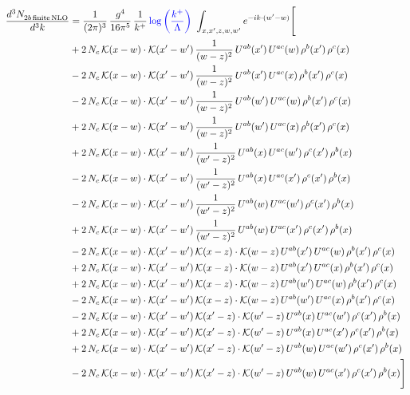 \documentclass[9pt]{article}
\numberwithin{equation}{section}
\begin{document}
\begin{align}
\frac{d^{3}N_{2b\,\rm finite\, NLO}^{\rm}}{d^{3}k} & = \frac{1}{(2\pi)^{3}}\,\frac{g^{4}}{16\pi^{5}}\,\frac{1}{k^{+}}\,{\color{blue}\log{\left(\frac{k^{+}}{\Lambda}\right)}}\,\,\int_{x,x',z,w,w'}e^{-ik\cdot(w'-w)}\Bigg[\notag\\ & +2\,N_{c}\,\mathcal{K}(x-w)\cdot\mathcal{K}(x'-w')\,\frac{1}{(w-z)^{2}}\,U^{ab}(x')\,U^{ac}(w)\,\rho^{b}(x')\,\rho^{c}(x)\notag\\
&-2\,N_{c}\,\mathcal{K}(x-w)\cdot\mathcal{K}(x'-w')\,\frac{1}{(w-z)^{2}}\,U^{ab}(x')\,U^{ac}(x)\,\rho^{b}(x')\,\rho^{c}(x)\notag\\
&-2\,N_{c}\,\mathcal{K}(x-w)\cdot\mathcal{K}(x'-w')\,\frac{1}{(w-z)^{2}}\,U^{ab}(w')\,U^{ac}(w)\,\rho^{b}(x')\,\rho^{c}(x)\notag\\
&+2\,N_{c}\,\mathcal{K}(x-w)\cdot\mathcal{K}(x'-w')\,\frac{1}{(w-z)^{2}}\,U^{ab}(w')\,U^{ac}(x)\,\rho^{b}(x')\,\rho^{c}(x)\notag\\
&+2\,N_{c}\,\mathcal{K}(x-w)\cdot\mathcal{K}(x'-w')\,\frac{1}{(w'-z)^{2}}\,U^{ab}(x)\,U^{ac}(w')\,\rho^{c}(x')\,\rho^{b}(x)\notag\\
&-2\,N_{c}\,\mathcal{K}(x-w)\cdot\mathcal{K}(x'-w')\,\frac{1}{(w'-z)^{2}}\,U^{ab}(x)\,U^{ac}(x')\,\rho^{c}(x')\,\rho^{b}(x)\notag\\
&-2\,N_{c}\,\mathcal{K}(x-w)\cdot\mathcal{K}(x'-w')\,\frac{1}{(w'-z)^{2}}\,U^{ab}(w)\,U^{ac}(w')\,\rho^{c}(x')\,\rho^{b}(x)\notag\\
&+2\,N_{c}\,\mathcal{K}(x-w)\cdot\mathcal{K}(x'-w')\,\frac{1}{(w'-z)^{2}}\,U^{ab}(w)\,U^{ac}(x')\,\rho^{c}(x')\,\rho^{b}(x)\notag\\
&-2\,N_{c}\,\mathcal{K}(x-w)\cdot\mathcal{K}(x'-w')\,\mathcal{K}(x-z)\cdot\mathcal{K}(w-z)\,U^{ab}(x')\,U^{ac}(w)\,\rho^{b}(x')\,\rho^{c}(x)\notag\\
&+2\,N_{c}\,\mathcal{K}(x-w)\cdot\mathcal{K}(x'-w')\,\mathcal{K}(x-z)\cdot\mathcal{K}(w-z)\,U^{ab}(x')\,U^{ac}(x)\,\rho^{b}(x')\,\rho^{c}(x)\notag\\
&+2\,N_{c}\,\mathcal{K}(x-w)\cdot\mathcal{K}(x'-w')\,\mathcal{K}(x-z)\cdot\mathcal{K}(w-z)\,U^{ab}(w')\,U^{ac}(w)\,\rho^{b}(x')\,\rho^{c}(x)\notag\\
&-2\,N_{c}\,\mathcal{K}(x-w)\cdot\mathcal{K}(x'-w')\,\mathcal{K}(x-z)\cdot\mathcal{K}(w-z)\,U^{ab}(w')\,U^{ac}(x)\,\rho^{b}(x')\,\rho^{c}(x)\notag\\
&-2\,N_{c}\,\mathcal{K}(x-w)\cdot\mathcal{K}(x'-w')\,\mathcal{K}(x'-z)\cdot\mathcal{K}(w'-z)\,U^{ab}(x)\,U^{ac}(w')\,\rho^{c}(x')\,\rho^{b}(x)\notag\\
&+2\,N_{c}\,\mathcal{K}(x-w)\cdot\mathcal{K}(x'-w')\,\mathcal{K}(x'-z)\cdot\mathcal{K}(w'-z)\,U^{ab}(x)\,U^{ac}(x')\,\rho^{c}(x')\,\rho^{b}(x)\notag\\
&+2\,N_{c}\,\mathcal{K}(x-w)\cdot\mathcal{K}(x'-w')\,\mathcal{K}(x'-z)\cdot\mathcal{K}(w'-z)\,U^{ab}(w)\,U^{ac}(w')\,\rho^{c}(x')\,\rho^{b}(x)\notag\\
&-2\,N_{c}\,\mathcal{K}(x-w)\cdot\mathcal{K}(x'-w')\,\mathcal{K}(x'-z)\cdot\mathcal{K}(w'-z)\,U^{ab}(w)\,U^{ac}(x')\,\rho^{c}(x')\,\rho^{b}(x)\Bigg]
\end{align}
\end{document}
